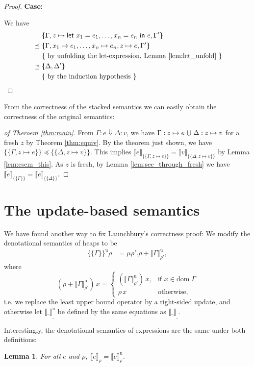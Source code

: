 \documentclass{jfp1}
\newtheorem{lemma}{Lemma}
\theoremstyle{nonumberbreak}
\newtheorem{proof}{Proof}
\newcommand{\sLet}[2]{\text{\textsf{let}}\ #1\ \text{\textsf{in}}\ #2}
\newcommand{\sred}[4]{#1 : #2 \Downarrow #3 : #4}
\newcommand{\ssred}[4]{#1 : #2 \mathrel{\rotatebox[origin=c]{90}{$\Lleftarrow$}} #3 : #4}
\newcommand{\sRule}[1]{\text{{\textsc{#1}}}}
\newcommand{\dom}[1]{\text{dom}\;#1}
\newcommand{\xeng}{x_1 = e_1, \ldots, x_n = e_n}
\newcommand{\xen}{x_1\mapsto e_1, \ldots, x_n\mapsto e_n}
\newcommand{\dsem}[2]{\llbracket #1 \rrbracket_{#2}}
\newcommand{\esem}[1]{\{\!\!\!\{#1\}\!\!\!\}}
\newcommand{\dsemu}[2]{\llbracket #1 \rrbracket^{\text{u}}_{#2}}
\newcommand{\esemu}[1]{\{\!\!\!\{#1\}\!\!\!\}^{\text{u}}}
\newcommand{\case}[1]{\par\smallskip\noindent\textbf{Case:} #1\nopagebreak\par\noindent\ignorespaces}
\newcommand{\beginright}{&\mathrel{\phantom{=}}}
\newcommand{\aexpl}[1]{&\mathrel{\phantom{=}}\left\{\text{ #1 }\right\}}
\begin{document}
\begin{proof}
\case{\sRule{Let}}
We have
\begin{align*}
\beginright
\esem{\Gamma,z \mapsto \sLet{\xeng}e, \Gamma'}\\
&\preceq \esem{\Gamma,\xen, z \mapsto e, \Gamma'} \\
\aexpl{by unfolding the let-expression, Lemma \ref{lem:let_unfold}} \\
&\preceq \esem{\Delta,\Delta'}\\
\aexpl{by the induction hypothesis}
\end{align*}
\end{proof}

From the correctness of the stacked semantics we can easily obtain the correctness of the original semantics:

\begin{proof}[of Theroem \ref{thm:main}]
From $\sred \Gamma e \Delta v$, we have $\ssred{\Gamma}{z \mapsto e}{\Delta}{z\mapsto v}$ for a fresh $z$ by Theorem \ref{thm:equiv}. By the theorem just shown, we have $\esem{\Gamma, z \mapsto e} \preceq \esem{\Delta, z\mapsto v}$. This implies $\dsem{e}{\esem{\Gamma, z \mapsto e}} = \dsem{v}{\esem{\Delta, z\mapsto v}}$ by Lemma \ref{lem:esem_this}. As $z$ is fresh, by Lemma \ref{lem:see_through_fresh} we have $\dsem{e}{\esem{\Gamma}} = \dsem{e}{\esem{\Delta}}$.
\end{proof}

\section{The update-based semantics}
\label{updsemantics}

We have found another way to fix Launchbury's correctness proof: We modify the denotational semantics of heaps to be
\begin{align*}
\esemu{ \Gamma }\rho &= \mu \rho'. \rho + \dsemu{\Gamma}{\rho'},
\end{align*}
where
\[
(\rho + \dsemu{\Gamma}{\rho'})\, x = 
\begin{cases}
(\dsemu{\Gamma}{\rho'})\, x, &\text{if } x \in \dom \Gamma\\
\rho\, x &\text{otherwise},
\end{cases}
\]
i.e. we replace the least upper bound operator by a right-sided update, and otherwise let $\dsemu{\_}\_$ be defined by the same equations as $\dsem{\_}\_$.

Interestingly, the denotational semantics of expressions are the same under both definitions:
\begin{lemma}
For all $e$ and $\rho$, $\dsem{e}{\rho} = \dsemu{e}{\rho}$.
\label{lem:deneq}
\end{lemma}
\end{document}

